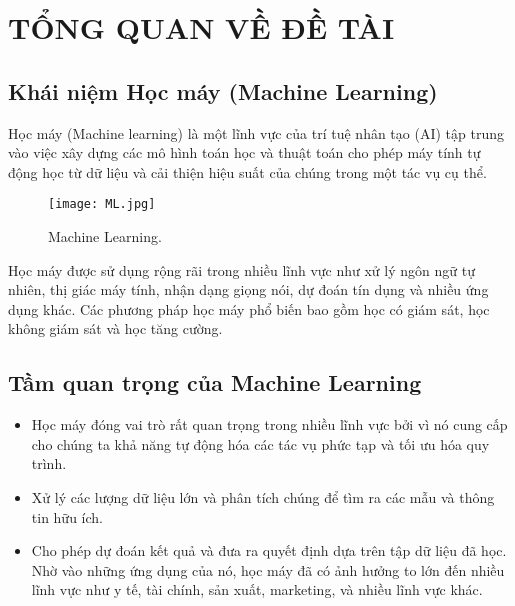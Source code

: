 
\chapter{TỔNG QUAN VỀ ĐỀ TÀI} 

\label{Chapter1} 


\newcommand{\keyword}[1]{\textbf{#1}}
\newcommand{\tabhead}[1]{\textbf{#1}}
\newcommand{\code}[1]{\texttt{#1}}
\newcommand{\file}[1]{\texttt{\bfseries#1}}
\newcommand{\option}[1]{\texttt{\itshape#1}}



\section{Khái niệm Học máy (Machine Learning)}

Học máy (Machine learning) là một lĩnh vực của trí tuệ nhân tạo (AI) tập trung vào việc xây dựng các mô hình toán học và thuật toán cho phép máy tính tự động học từ dữ liệu và cải thiện hiệu suất của chúng trong một tác vụ cụ thể. 

\begin{figure}[h!]
	\centering
	\texttt{[image: ML.jpg]}
	\caption[Machine Learning.]{Machine Learning.}
	\label{fig:ML}
\end{figure} 

Học máy được sử dụng rộng rãi trong nhiều lĩnh vực như xử lý ngôn ngữ tự nhiên, thị giác máy tính, nhận dạng giọng nói, dự đoán tín dụng và nhiều ứng dụng khác. Các phương pháp học máy phổ biến bao gồm học có giám sát, học không giám sát và học tăng cường.

\section{Tầm quan trọng của Machine Learning}

\begin{itemize}
	\item Học máy đóng vai trò rất quan trọng trong nhiều lĩnh vực bởi vì nó cung cấp cho chúng ta khả năng tự động hóa các tác vụ phức tạp và tối ưu hóa quy trình. 
	
	\item Xử lý các lượng dữ liệu lớn và phân tích chúng để tìm ra các mẫu và thông tin hữu ích.
	
	\item Cho phép dự đoán kết quả và đưa ra quyết định dựa trên tập dữ liệu đã học. Nhờ vào những ứng dụng của nó, học máy đã có ảnh hưởng to lớn đến nhiều lĩnh vực như y tế, tài chính, sản xuất, marketing, và nhiều lĩnh vực khác.
\end{itemize}

